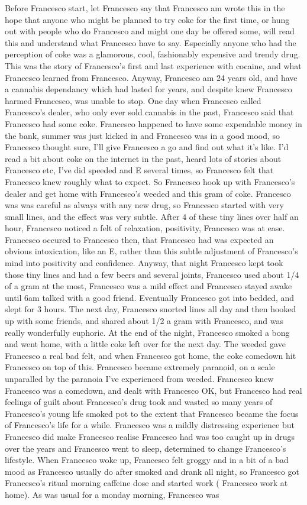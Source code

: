 \documentclass[12pt]{book}
\begin{document}
Before Francesco start, let Francesco say that Francesco am wrote this in the hope that anyone who might be planned to try coke for the first time, or hung out with people who do Francesco and might one day be offered some, will read this and understand what Francesco have to say. Especially anyone who had the perception of coke was a glamorous, cool, fashionably expensive and trendy drug. This was the story of Francesco's first and last experience with cocaine, and what Francesco learned from Francesco. Anyway, Francesco am 24 years old, and have a cannabis dependancy which had lasted for years, and despite knew Francesco harmed Francesco, was unable to stop. One day when Francesco called Francesco's dealer, who only ever sold cannabis in the past, Francesco said that Francesco had some coke. Francesco happened to have some expendable money in the bank, summer was just kicked in and Francesco was in a good mood, so Francesco thought sure, I'll give Francesco a go and find out what it's like. I'd read a bit about coke on the internet in the past, heard lots of stories about Francesco etc, I've did speeded and E several times, so Francesco felt that Francesco knew roughly what to expect. So Francesco hook up with Francesco's dealer and get home with Francesco's weeded and this gram of coke. Francesco was was careful as always with any new drug, so Francesco started with very small lines, and the effect was very subtle. After 4 of these tiny lines over half an hour, Francesco noticed a felt of relaxation, positivity, Francesco was at ease. Francesco occured to Francesco then, that Francesco had was expected an obvious intoxication, like an E, rather than this subtle adjustment of Francesco's mind into positivity and confidence. Anyway, that night Francesco kept took those tiny lines and had a few beers and several joints, Francesco used about 1/4 of a gram at the most, Francesco was a mild effect and Francesco stayed awake until 6am talked with a good friend. Eventually Francesco got into bedded, and slept for 3 hours. The next day, Francesco snorted lines all day and then hooked up with some friends, and shared about 1/2 a gram with Francesco, and was really wonderfully euphoric. At the end of the night, Francesco smoked a bong and went home, with a little coke left over for the next day. The weeded gave Francesco a real bad felt, and when Francesco got home, the coke comedown hit Francesco on top of this. Francesco became extremely paranoid, on a scale unparalled by the paranoia I've experienced from weeded. Francesco knew Francesco was a comedown, and dealt with Francesco OK, but Francesco had real feelings of guilt about Francesco's drug took and wasted so many years of Francesco's young life smoked pot to the extent that Francesco became the focus of Francesco's life for a while. Francesco was a mildly distressing experience but Francesco did make Francesco realise Francesco had was too caught up in drugs over the years and Francesco went to sleep, determined to change Francesco's lifestyle. When Francesco woke up, Francesco felt groggy and in a bit of a bad mood as Francesco usually do after smoked and drank all night, so Francesco got Francesco's ritual morning caffeine dose and started work ( Francesco work at home). As was usual for a monday morning, Francesco was 
\end{document}
